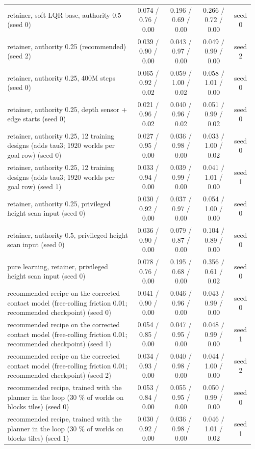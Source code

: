 \begin{table}[t]
{\begin{tabular}{lcccc}
retainer, soft LQR base, authority 0.5 (seed 0) & 0.074 / 0.76 / 0.00 & 0.196 / 0.69 / 0.00 & 0.266 / 0.72 / 0.00 & seed 0\\
retainer, authority 0.25 (recommended) (seed 2) & 0.039 / 0.90 / 0.00 & 0.043 / 0.97 / 0.00 & 0.049 / 0.99 / 0.00 & seed 2\\
retainer, authority 0.25, 400M steps (seed 0) & 0.065 / 0.92 / 0.02 & 0.059 / 1.00 / 0.02 & 0.058 / 1.01 / 0.00 & seed 0\\
retainer, authority 0.25, depth sensor + edge starts (seed 0) & 0.021 / 0.96 / 0.02 & 0.040 / 0.96 / 0.02 & 0.051 / 0.99 / 0.02 & seed 0\\
retainer, authority 0.25, 12 training designs (adds tau3; 1920 worlds per goal row) (seed 0) & 0.027 / 0.95 / 0.00 & 0.036 / 0.98 / 0.00 & 0.033 / 1.00 / 0.02 & seed 0\\
retainer, authority 0.25, 12 training designs (adds tau3; 1920 worlds per goal row) (seed 1) & 0.033 / 0.94 / 0.00 & 0.039 / 0.99 / 0.00 & 0.041 / 1.01 / 0.00 & seed 1\\
retainer, authority 0.25, privileged height scan input (seed 0) & 0.030 / 0.92 / 0.00 & 0.037 / 0.97 / 0.00 & 0.054 / 1.00 / 0.00 & seed 0\\
retainer, authority 0.5, privileged height scan input (seed 0) & 0.036 / 0.90 / 0.00 & 0.079 / 0.87 / 0.00 & 0.104 / 0.89 / 0.00 & seed 0\\
pure learning, retainer, privileged height scan input (seed 0) & 0.078 / 0.76 / 0.00 & 0.195 / 0.68 / 0.00 & 0.356 / 0.61 / 0.02 & seed 0\\
recommended recipe on the corrected contact model (free-rolling friction 0.01; recommended checkpoint) (seed 0) & 0.041 / 0.90 / 0.00 & 0.046 / 0.96 / 0.00 & 0.043 / 0.99 / 0.00 & seed 0\\
recommended recipe on the corrected contact model (free-rolling friction 0.01; recommended checkpoint) (seed 1) & 0.054 / 0.85 / 0.00 & 0.047 / 0.95 / 0.00 & 0.048 / 0.99 / 0.00 & seed 1\\
recommended recipe on the corrected contact model (free-rolling friction 0.01; recommended checkpoint) (seed 2) & 0.034 / 0.93 / 0.00 & 0.040 / 0.98 / 0.00 & 0.044 / 1.00 / 0.00 & seed 2\\
recommended recipe, trained with the planner in the loop (30 \% of worlds on blocks tiles) (seed 0) & 0.053 / 0.84 / 0.00 & 0.055 / 0.95 / 0.00 & 0.050 / 0.99 / 0.00 & seed 0\\
recommended recipe, trained with the planner in the loop (30 \% of worlds on blocks tiles) (seed 1) & 0.030 / 0.92 / 0.00 & 0.036 / 0.98 / 0.00 & 0.046 / 1.01 / 0.02 & seed 1\\
\bottomrule\end{tabular}}
\end{table}
